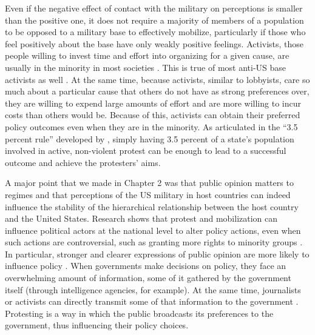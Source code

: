 Even if the negative effect of contact with the military on perceptions is smaller than the positive one, it does not require a majority of members of a population to be opposed to a military base to effectively mobilize, particularly if those who feel positively about the base have only weakly positive feelings. Activists, those people willing to invest time and effort into organizing for a given cause, are usually in the minority in most societies \cite{Burstein2002}.  This is true of most anti-US base activists as well \cite{Fitz2015}.  At the same time, because activists, similar to lobbyists, care so much about a particular cause that others do not have as strong preferences over, they are willing to expend large amounts of effort and are more willing to incur costs than others would be.  Because of this, activists can obtain their preferred policy outcomes even when they are in the minority. As articulated in the ``3.5 percent rule'' developed by , simply having 3.5 percent of a state's population involved in active, non-violent protest can be enough to lead to a successful outcome and achieve the protesters' aims. 


A major point that we made in Chapter 2 was that public opinion matters to regimes and that perceptions of the US military in host countries can indeed influence the stability of the hierarchical relationship between the host country and the United States. Research shows that protest and mobilization can influence political actors at the national level to alter policy actions, even when such actions are controversial, such as granting more rights to minority groups \cite{Gillion2013,Fassiotto2017}. In particular, stronger and clearer expressions of public opinion are more likely to influence policy \cite{Baumgartner2015,Fassiotto2017}. When governments make decisions on policy, they face an overwhelming amount of information, some of it gathered by the government itself (through intelligence agencies, for example). At the same time, journalists or activists can directly transmit some of that information to the government \cite[p. 15]{Baumgartner2015}. Protesting is a way in which the public broadcasts its preferences to the government, thus influencing their policy choices. 


